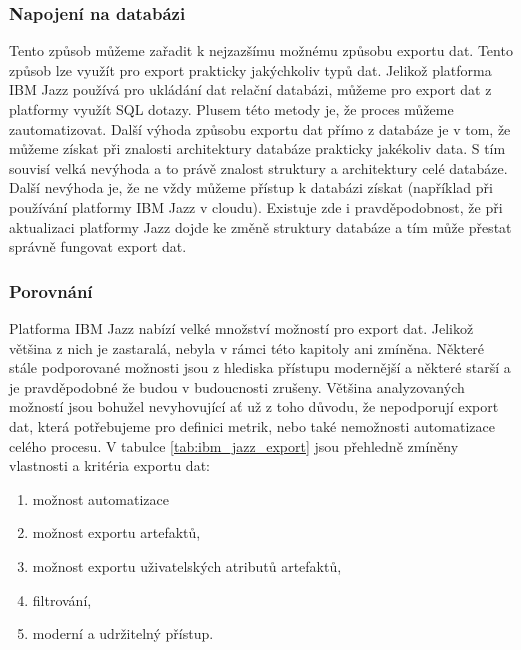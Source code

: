 \documentclass[czech,master,public,dept460,male,cpdeclaration,oneside]{diploma}
\begin{document}
\subsubsection{Napojení na databázi}
Tento způsob můžeme zařadit k nejzazšímu možnému způsobu exportu dat. Tento způsob lze využít pro export prakticky jakýchkoliv typů dat. Jelikož platforma IBM Jazz používá pro ukládání dat relační databázi, můžeme pro export dat z platformy využít SQL dotazy. Plusem této metody je, že proces můžeme zautomatizovat. Další výhoda způsobu exportu dat přímo z databáze je v tom, že můžeme získat při znalosti architektury databáze prakticky jakékoliv data. S tím souvisí velká nevýhoda a to právě znalost struktury a architektury celé databáze. Další nevýhoda je, že ne vždy můžeme přístup k databázi získat (například při používání platformy IBM Jazz v cloudu). Existuje zde i pravděpodobnost, že při aktualizaci platformy Jazz dojde ke změně struktury databáze a tím může přestat správně fungovat export dat.

\subsubsection{Porovnání}
Platforma IBM Jazz nabízí velké množství možností pro export dat. Jelikož většina z nich je zastaralá, nebyla v rámci této kapitoly ani zmíněna. Některé stále podporované možnosti jsou z hlediska přístupu modernější a některé starší a je pravděpodobné že budou v budoucnosti zrušeny. Většina analyzovaných možností jsou bohužel nevyhovující ať už z toho důvodu, že nepodporují export dat, která potřebujeme pro definici metrik, nebo také nemožnosti automatizace celého procesu. V tabulce \ref{tab:ibm_jazz_export} jsou přehledně zmíněny vlastnosti a kritéria exportu dat:

\begin{enumerate}
\item možnost automatizace
\item možnost exportu artefaktů,
\item možnost exportu uživatelských atributů artefaktů,
\item filtrování,
\item moderní a udržitelný přístup.
\end{enumerate}
\end{document}

